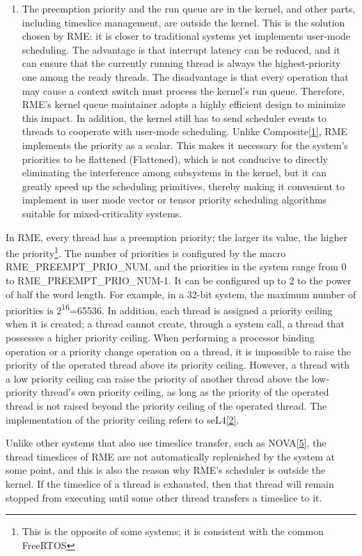 \begin{enumerate}
\item
  The preemption priority and the run queue are in the kernel, and other parts, including timeslice management, are outside the kernel. This is the solution chosen by RME: it is closer to traditional systems yet implements user-mode scheduling. The advantage is that interrupt latency can be reduced, and it can ensure that the currently running thread is always the highest-priority one among the ready threads. The disadvantage is that every operation that may cause a context switch must process the kernel's run queue. Therefore, RME's kernel queue maintainer adopts a highly efficient design to minimize this impact. In addition, the kernel still has to send scheduler events to threads to cooperate with user-mode scheduling. Unlike Composite\hyperref[cite:4-1]{{[}1{]}}, RME implements the priority as a scalar. This makes it necessary for the system's priorities to be flattened (Flattened), which is not conducive to directly eliminating the interference among subsystems in the kernel, but it can greatly speed up the scheduling primitives, thereby making it convenient to implement in user mode vector or tensor priority scheduling algorithms suitable for mixed-criticality systems.
\end{enumerate}

In RME, every thread has a preemption priority; the larger its value, the higher the priority\footnote{This is the opposite of some systems; it is consistent with the common FreeRTOS}. The number of priorities is configured by the macro RME\_PREEMPT\_PRIO\_NUM, and the priorities in the system range from 0 to
RME\_PREEMPT\_PRIO\_NUM-1. It can be configured up to 2 to the power of half the word length. For example, in a 32-bit system, the maximum number of priorities is 2\textsuperscript{16}=65536. In addition, each thread is assigned a priority ceiling when it is created; a thread cannot create, through a system call, a thread that possesses a higher priority ceiling. When performing a processor binding operation or a priority change operation on a thread, it is impossible to raise the priority of the operated thread above its priority ceiling. However, a thread with a low priority ceiling can raise the priority of another thread above the low-priority thread's own priority ceiling, as long as the priority of the operated thread is not raised beyond the priority ceiling of the operated thread. The implementation of the priority ceiling refers to seL4\hyperref[cite:4-2]{{[}2{]}}.

Unlike other systems that also use timeslice transfer, such as NOVA\hyperref[cite:4-5]{{[}5{]}}, the thread timeslices of RME are not automatically replenished by the system at some point, and this is also the reason why RME's scheduler is outside the kernel. If the timeslice of a thread is exhausted, then that thread will remain stopped from executing until some other thread transfers a timeslice to it.


